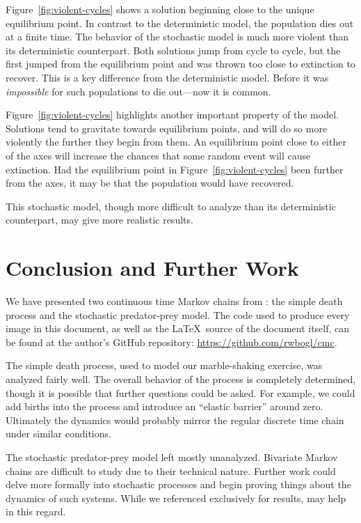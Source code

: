 \documentclass[12pt]{article}
\theoremstyle{definition}
\begin{document}
Figure~\ref{fig:violent-cycles} shows a solution beginning close to the unique
equilibrium point. In contrast to the deterministic model, the population dies
out at a finite time. The behavior of the stochastic model is much more violent
than its deterministic counterpart. Both solutions jump from cycle to cycle,
but the first jumped from the equilibrium point and was thrown too close to
extinction to recover. This is a key difference from the deterministic model.
Before it was \emph{impossible} for such populations to die out---now it is
common.

Figure~\ref{fig:violent-cycles} highlights another important property of the
model. Solutions tend to gravitate towards equilibrium points, and will do so
more violently the further they begin from them. An equilibrium point close to
either of the axes will increase the chances that some random event will cause
extinction. Had the equilibrium point in Figure~\ref{fig:violent-cycles} been
further from the axes, it may be that the population would have recovered.

This stochastic model, though more difficult to analyze than its deterministic
counterpart, may give more realistic results.

\section{Conclusion and Further Work}
\label{sec:further_work}

We have presented two continuous time Markov chains from
\cite{allen2010introduction}: the simple death process and the stochastic
predator-prey model. The code used to produce every image in this document, as
well as the \LaTeX\ source of the document itself, can be found at the author's
GitHub repository: \url{https://github.com/rwbogl/cmc}.

The simple death process, used to model our marble-shaking exercise, was
analyzed fairly well. The overall behavior of the process is completely
determined, though it is possible that further questions could be asked. For
example, we could add births into the process and introduce an ``elastic
barrier'' around zero. Ultimately the dynamics would probably mirror the
regular discrete time chain under similar conditions.

The stochastic predator-prey model left mostly unanalyzed. Bivariate Markov
chains are difficult to study due to their technical nature. Further work could
delve more formally into stochastic processes and begin proving things about
the dynamics of such systems. While we referenced \citet{allen2010introduction}
exclusively for results, \cite{kao1997introduction, berger2012introduction,
bremaud1998markov} may help in this regard.
\end{document}

